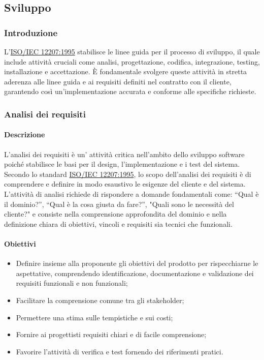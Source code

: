 \subsection{Sviluppo}

\subsubsection{Introduzione}
L'\href{https://www.math.unipd.it/~tullio/IS-1/2009/Approfondimenti/ISO_12207-1995.pdf}{ISO/IEC 12207:1995} stabilisce le linee guida per il processo di sviluppo, il quale include attività cruciali come analisi, progettazione, codifica, integrazione, testing, installazione e accettazione. È fondamentale svolgere queste attività in stretta aderenza alle linee guida e ai requisiti definiti nel contratto con il cliente, garantendo così un'implementazione accurata e conforme alle specifiche richieste.

\subsubsection{Analisi dei requisiti}
\paragraph{Descrizione}
L'analisi dei requisiti è un' attività critica nell'ambito dello sviluppo software poiché stabilisce le basi per il design, l'implementazione e i test del sistema. \\
Secondo lo standard \href{https://www.math.unipd.it/~tullio/IS-1/2009/Approfondimenti/ISO_12207-1995.pdf}{ISO/IEC 12207:1995}, lo scopo dell'analisi dei requisiti è di comprendere e definire in modo esaustivo le esigenze del cliente e del sistema. \\
L’attività di analisi richiede di rispondere a domande fondamentali come: “Qual è il dominio?”, “Qual è la cosa giusta da fare?”, "Quali sono le necessità del cliente?" e consiste nella comprensione approfondita del dominio e nella definizione chiara di obiettivi, vincoli e requisiti sia tecnici che funzionali.
\paragraph{Obiettivi}
\begin{itemize}
    \item Definire insieme alla proponente gli obiettivi del prodotto per rispecchiarne le aspettative, comprendendo identificazione, documentazione e validazione dei requisiti funzionali e non funzionali;
    \item Facilitare la comprensione comune tra gli stakeholder;
    \item Permettere una stima sulle tempistiche e sui costi;
    \item Fornire ai progettisti requisiti chiari e di facile comprensione;
    \item Favorire l'attività di verifica e test fornendo dei riferimenti pratici.
\end{itemize}

